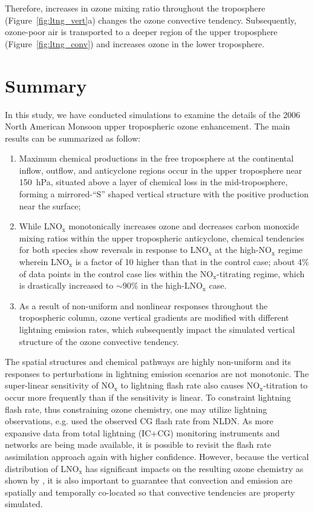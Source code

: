 Therefore, increases in ozone mixing ratio throughout the troposphere (Figure~\ref{fig:ltng_vert}a)
changes the ozone convective tendency. Subsequently, ozone-poor air is transported
to a deeper region of the upper troposphere (Figure~\ref{fig:ltng_conv}) and increases
ozone in the lower troposphere.

\section{Summary}\label{sect:summary}

In this study, we have conducted simulations to examine the details of the
2006 North American Monsoon upper tropospheric ozone enhancement.
The main results can be summarized as follow:
\begin{enumerate}
\item Maximum chemical productions in the free troposphere at the continental
inflow, outflow, and anticyclone regions occur in the upper troposphere near
150~hPa, situated above a layer of chemical loss in the mid-troposphere, forming
a mirrored-``S'' shaped vertical structure with the positive production near the surface;
\item While LNO$_\mathrm{x}$ monotonically increases ozone and decreases
carbon monoxide mixing ratios within the upper tropospheric anticyclone,
chemical tendencies for both species show reversals in
response to LNO$_\mathrm{x}$ at the high-NO$_\mathrm{x}$ regime wherein
LNO$_{\mathrm{x}}$ is a factor of 10 higher than that in the control case; about
4\% of data points in the control case lies within the $\mathrm{NO_x}$-titrating
regime, which is drastically increased to $\sim90\%$ in the high-$\mathrm{LNO_x}$ case.
\item As a result of non-uniform and nonlinear responses throughout the tropospheric column,
ozone vertical gradients are modified with different lightning emission rates, which subsequently impact the
simulated vertical structure of the ozone convective tendency.

\end{enumerate}

The spatial structures and chemical pathways are highly non-uniform and
its responses to perturbations in lightning emission scenarios are not
monotonic. The super-linear sensitivity of NO$_\mathrm{x}$ to lightning flash rate
also causes $\mathrm{NO_x}$-titration to occur more frequently than if the sensitivity is linear.
To constraint lightning flash rate, thus constraining ozone chemistry,
one may utilize lightning observations, e.g. \citet{Cooper:2009nx} used the observed CG
flash rate from NLDN. As more expansive data from total lightning (IC+CG)
monitoring instruments and networks are being made available, it is possible to
revisit the flash rate assimilation approach again with higher confidence. However, because
the vertical distribution of LNO$_\mathrm{x}$ has significant
impacts on the resulting ozone chemistry as shown by \citet{Pickering:1998sh}, it is also important to guarantee
that convection and emission are spatially and temporally co-located so that
convective tendencies are property simulated.

